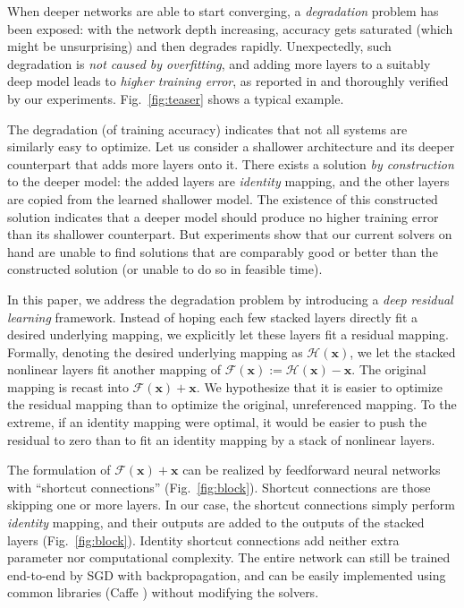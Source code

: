 \documentclass{article}
\newcommand{\ve}[1]{\mathbf{#1}} %
\begin{document}
When deeper networks are able to start converging, a \emph{degradation} problem has been exposed:  with the network depth increasing, accuracy gets saturated (which might be unsurprising) and then degrades rapidly. Unexpectedly, such degradation is \emph{not caused by overfitting}, and adding more layers to a suitably deep model leads to \emph{higher training error}, as reported in \cite{He2015a, Srivastava2015} and thoroughly verified by our experiments. Fig.~\ref{fig:teaser} shows a typical example.

The degradation (of training accuracy) indicates that not all systems are similarly easy to optimize. Let us consider a shallower architecture and its deeper counterpart that adds more layers onto it. There exists a solution \emph{by construction} to the deeper model: the added layers are \emph{identity} mapping, and the other layers are copied from the learned shallower model. The existence of this constructed solution indicates that a deeper model should produce no higher training error than its shallower counterpart. But experiments show that our current solvers on hand are unable to find solutions that are comparably good or better than the constructed solution (or unable to do so in feasible time).

In this paper, we address the degradation problem by introducing a \emph{deep residual learning} framework.
Instead of hoping each few stacked layers directly fit a desired underlying mapping, we explicitly let these layers fit a residual mapping. Formally, denoting the desired underlying mapping as $\mathcal{H}(\ve{x})$, we let the stacked nonlinear layers fit another mapping of $\mathcal{F}(\ve{x}):=\mathcal{H}(\ve{x})-\ve{x}$. The original mapping is recast into $\mathcal{F}(\ve{x})+\ve{x}$.
We hypothesize that it is easier to optimize the residual mapping than to optimize the original, unreferenced mapping. To the extreme, if an identity mapping were optimal, it would be easier to push the residual to zero than to fit an identity mapping by a stack of nonlinear layers.

The formulation of $\mathcal{F}(\ve{x})+\ve{x}$ can be realized by feedforward neural networks with ``shortcut connections'' (Fig.~\ref{fig:block}). Shortcut connections \cite{Bishop1995,Ripley1996,Venables1999} are those skipping one or more layers. In our case, the shortcut connections simply perform \emph{identity} mapping, and their outputs are added to the outputs of the stacked layers (Fig.~\ref{fig:block}). Identity shortcut connections add neither extra parameter nor computational complexity. The entire network can still be trained end-to-end by SGD with backpropagation, and can be easily implemented using common libraries (Caffe \cite{Jia2014}) without modifying the solvers.
\end{document}
